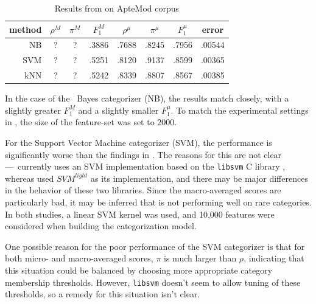 \begin{table}
\begin{center}
\begin{tabular}{|r c c c c c c c|}
\hline
method & $\rho^M$ & $\pi^M$ & $F_1^M$ & $\rho^\mu$ & $\pi^\mu$ & $F_1^\mu$ & error \\
\hline
NB  & ? & ? & .3886 & .7688 & .8245 & .7956 & .00544 \\
SVM & ? & ? & .5251 & .8120 & .9137 & .8599 & .00365 \\
kNN & ? & ? & .5242 & .8339 & .8807 & .8567 & .00385 \\
\hline
\end{tabular}
\end{center}
\caption{Results from \cite{yang:99} on ApteMod corpus}
\label{aptemod-yang}
\end{table}

In the case of the \naive\ Bayes categorizer (NB), the results match
\cite{yang:99} closely, with a slightly greater $F_1^M$ and a slightly
smaller $F_1^\mu$.  To match the experimental
settings in \cite{yang:99}, the size of the feature-set was set to
2000.

For the Support Vector Machine categorizer (SVM), the performance is
significantly worse than the findings in \cite{yang:99}.  The reasons
for this are not clear---\aicat\ currently uses an SVM implementation
based on the \texttt{libsvm} C library \cite{libsvm}, whereas
\cite{yang:99} used $SVM^{light}$ as its
implementation\cite{joachims:99a}, and there may be major differences
in the behavior of these two libraries.  Since the macro-averaged scores are
particularly bad, it may be inferred that \cite{libsvm} is not
performing well on rare categories.  In both studies, a linear SVM
kernel was used, and 10,000 features were considered when building the
categorization model.

One possible reason for the poor performance of the SVM categorizer is
that for both micro- and macro-averaged scores, $\pi$ is much larger
than $\rho$, indicating that this situation could be balanced by
choosing more appropriate category membership thresholds.  However,
\texttt{libsvm} doesn't seem to allow tuning of these thresholds, so a
remedy for this situation isn't clear.

